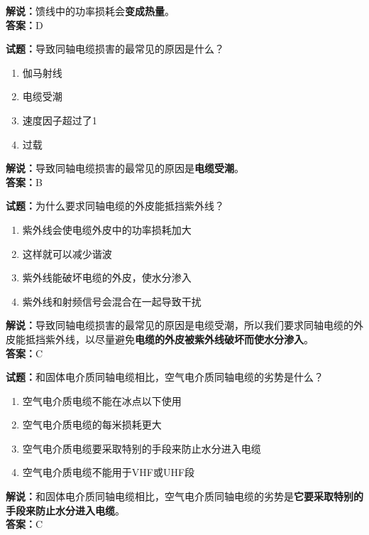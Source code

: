 \documentclass{ctexbook}
\begin{document}
\noindent\textbf{解说：}馈线中的功率损耗会\textbf{变成热量}。\\\noindent\textbf{答案：}D


\bigskip


\noindent\textbf{试题：}导致同轴电缆损害的最常见的原因是什么？

\begin{enumerate}[leftmargin=3em]
	\item 伽马射线
	\item 电缆受潮
	\item 速度因子超过了1
	\item 过载
\end{enumerate}

\noindent\textbf{解说：}导致同轴电缆损害的最常见的原因是\textbf{电缆受潮}。\\\noindent\textbf{答案：}B


\bigskip


\noindent\textbf{试题：}为什么要求同轴电缆的外皮能抵挡紫外线？

\begin{enumerate}[leftmargin=3em]

	\item 紫外线会使电缆外皮中的功率损耗加大
	\item 这样就可以减少谐波
	\item 紫外线能破坏电缆的外皮，使水分渗入
	\item 紫外线和射频信号会混合在一起导致干扰
\end{enumerate}

\noindent\textbf{解说：}导致同轴电缆损害的最常见的原因是电缆受潮，所以我们要求同轴电缆的外皮能抵挡紫外线，以尽量避免\textbf{电缆的外皮被紫外线破坏而使水分渗入}。\\\noindent\textbf{答案：}C


\bigskip


\noindent\textbf{试题：}和固体电介质同轴电缆相比，空气电介质同轴电缆的劣势是什么？

\begin{enumerate}[leftmargin=3em]
	\item 空气电介质电缆不能在冰点以下使用
	\item 空气电介质电缆的每米损耗更大
	\item 空气电介质电缆要采取特别的手段来防止水分进入电缆
	\item 空气电介质电缆不能用于VHF或UHF段
\end{enumerate}

\noindent\textbf{解说：}和固体电介质同轴电缆相比，空气电介质同轴电缆的劣势是\textbf{它要采取特别的手段来防止水分进入电缆}。\\\noindent\textbf{答案：}C%
\end{document}
